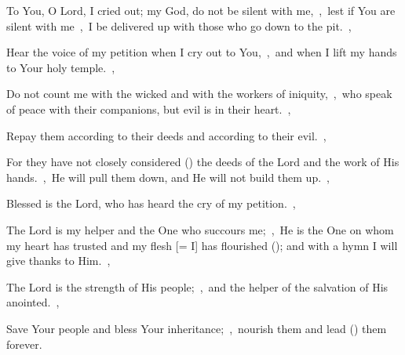 \documentclass[12pt,twoside,a5paper]{article}
\begin{document}



\begin{normalparskip}
  To You, O Lord, I cried out; my God, do not be silent with me,~\sep\ lest if You are silent with me~\sep\ I be delivered up with those who go down to the pit.~\sep


  Hear the voice of my petition when I cry out to You,~\sep\ and when I lift my hands to Your holy temple.~\sep

  Do not count me with the wicked and with the workers of iniquity,~\sep\ who speak of peace with their companions, but evil is in their heart.~\sep

  Repay them according to their deeds and according to their evil.~\sep

  For they have not closely considered () the deeds of the Lord and the work of His hands.~\sep\ He will pull them down, and He will not build them up.~\sep

  Blessed is the Lord, who has heard the cry of my petition.~\sep

  The Lord is my helper and the One who succours me;~\sep\ He is the One on whom my heart has trusted and my flesh [= I] has flourished (); and with a hymn I will give thanks to Him.~\sep

  The Lord is the strength of His people;~\sep\ and the helper of the salvation of His anointed.~\sep

  Save Your people and bless Your inheritance;~\sep\ nourish them and lead () them forever.
\end{normalparskip}

\end{document}
